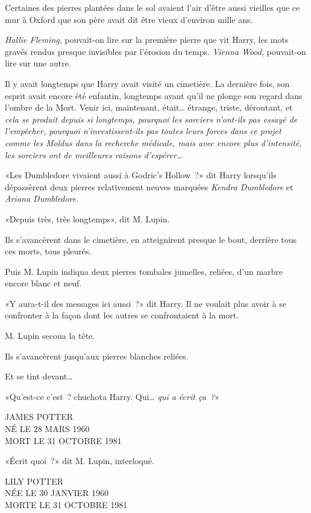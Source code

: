 Certaines des pierres plantées dans le sol avaient l'air d'être aussi vieilles que ce mur à Oxford que son père avait dit être vieux d'environ mille ans.

\emph{Hallie Fleming}, pouvait-on lire sur la première pierre que vit Harry, les mots gravés rendus presque invisibles par l'érosion du temps. \emph{Vienna Wood}, pouvait-on lire sur une autre.

Il y avait longtemps que Harry avait visité un cimetière. La dernière fois, son esprit avait encore été enfantin, longtemps avant qu'il ne plonge son regard dans l'ombre de la Mort. Venir ici, maintenant, était… étrange, triste, déroutant, et \emph{cela se produit depuis si longtemps, pourquoi les sorciers n'ont-ils pas essayé de l'empêcher, pourquoi n'investissent-ils pas toutes leurs forces dans ce projet comme les Moldus dans la recherche médicale, mais avec encore plus d'intensité, les sorciers ont de meilleures raisons d'espérer…}

«Les Dumbledore vivaient aussi à Godric's Hollow~?» dit Harry lorsqu'ils dépassèrent deux pierres relativement neuves marquées \emph{Kendra Dumbledore} et \emph{Ariana Dumbledore}.

«Depuis très, très longtemps», dit M. Lupin.

Ils s'avancèrent dans le cimetière, en atteignirent presque le bout, derrière tous ces morts, tous pleurés.

Puis M. Lupin indiqua deux pierres tombales jumelles, reliées, d'un marbre encore blanc et neuf.

«Y aura-t-il des messages ici aussi~?» dit Harry. Il ne voulait plus avoir à se confronter à la façon dont les autres se confrontaient à la mort.

M. Lupin secoua la tête.

Ils s'avancèrent jusqu'aux pierres blanches reliées.

Et se tint devant…

«Qu'est-ce c'est~? chuchota Harry. Qui… \emph{qui a écrit ça~?}»
\begin{center}
JAMES POTTER\\
NÉ LE 28 MARS 1960\\
MORT LE 31 OCTOBRE 1981
\end{center}

«Écrit quoi~?» dit M. Lupin, interloqué.

\begin{center}
LILY POTTER\\
NÉE LE 30 JANVIER 1960\\
MORTE LE 31 OCTOBRE 1981
\end{center}

